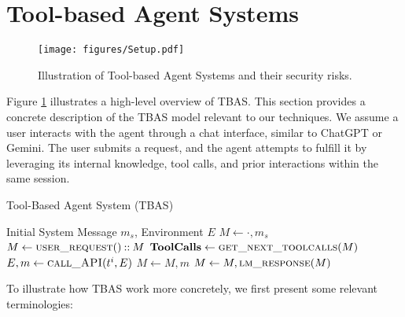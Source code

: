 \newcommand{\redacted}{\lozenge}
\section{Tool-based Agent Systems}
\begin{figure}[ht]
    \hspace{-0.1in}\texttt{[image: figures/Setup.pdf]}
    \caption{Illustration of Tool-based Agent Systems and their security risks. }
    \label{fig:tbas}
\end{figure}


Figure \ref{fig:tbas} illustrates a high-level overview of TBAS. This section provides a concrete description of the TBAS model relevant to our techniques. We assume a user interacts with the agent through a chat interface, similar to ChatGPT or Gemini. The user submits a request, and the agent attempts to fulfill it by leveraging its internal knowledge, tool calls, and prior interactions within the same session.

\begin{algorithm*}
\caption{Tool-Based Agent System (TBAS)}
\label{alg:TBAS}
\begin{algorithmic}[1]
\Require Initial System Message $m_s$, Environment $E$
\State $M \gets\cdot,m_s $ 
 
    \State $M \gets \textsc{user\_request}() \mathbin{::} M$ 
    \State $\textbf{ToolCalls} \gets \textsc{get\_next\_toolcalls}(M)$ 
        \State $E, m \gets \textsc{call\_API}(t^i, E)$ 
        \State $M \gets M,m$ 
    \EndFor
    \State $M \gets M,\textsc{lm\_response}(M)$ 
\EndWhile
\end{algorithmic}
\end{algorithm*}

To illustrate how TBAS work more concretely, we first present some relevant terminologies: 

